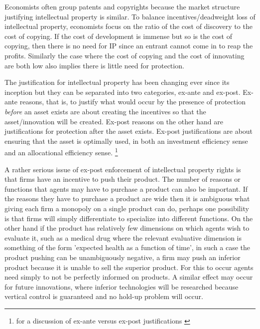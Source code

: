 \documentclass[12pt]{article}
\numberwithin{equation}{section}
\begin{document}
Economists often group patents and copyrights because the market structure justifying intellectual property is similar. To balance incentives/deadweight loss of intellectual property, economists focus on the ratio of the cost of discovery to the cost of copying. If the cost of development is immense but so is the cost of copying, then there is no need for IP since an entrant cannot come in to reap the profits. Similarly the case where the cost of copying and the cost of innovating are both low also implies there is little need for protection.


The justification for intellectual property has been changing ever since its inception but they can be separated into two categories, ex-ante and ex-post. Ex-ante reasons, that is, to justify what would occur by the presence of protection \textit{before} an asset exists are about creating the incentives so that the asset/innovation will be created. Ex-post reasons on the other hand are justifications for protection after the asset exists. Ex-post justifications are about ensuring that the asset is optimally used, in both an investment efficiency sense and an allocational efficiency sense. \footnote{for a discussion of ex-ante versus ex-post justifications \cite{Lemleyt2004}}

A rather serious issue of ex-post enforcement of intellectual property rights is that firms have an incentive to push their product. The number of reasons or functions that agents may have to purchase a product can also be important. If the reasons they have to purchase a product are wide then it is ambiguous what giving each firm a monopoly on a single product can do, perhaps one possibility is that firms will simply differentiate to specialize into different functions. On the other hand if the product has relatively few dimensions on which agents wish to evaluate it, such as a medical drug where the relevant evaluative dimension is something of the form 'expected health as a function of time', in such a case the product pushing can be unambiguously negative, a firm may push an inferior product because it is unable to sell the superior product. For this to occur agents need simply to not be perfectly informed on products. A similar effect may occur for future innovations, where inferior technologies will be researched because vertical control is guaranteed and no hold-up problem will occur.

\end{document}
